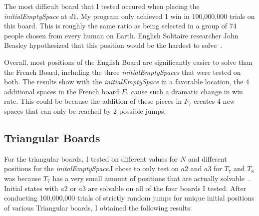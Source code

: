 \documentclass{article}
\begin{document}
The most difficult board that I tested occured when placing the \textit{initialEmptySpace} at $d1$. My program only achieved 1 win in 100,000,000 trials on this board. This is roughly the same ratio as being selected in a group of 74 people chosen from every human on Earth. English Solitaire researcher John Beasley hypothesized that this position would be the hardest to solve~\cite{Beasley}.

Overall, most positions of the English Board are significantly easier to solve than the French Board, including the three \textit{initialEmptySpaces} that were tested on both. The results show with the \textit{initialEmptySpace} in a favorable location, the 4 additional spaces in the French board $F_7$ cause such a dramatic change in win rate. This could be because the addition of these pieces in $F_7$ creates 4 new spaces that can only be reached by 2 possible jumps.

\subsection{Triangular Boards}
\label{3.3Triangular}
For the triangular boards, I tested on different values for $N$ and different positions for the \textit{initalEmptySpace}.I chose to only test on $a2$ and $a3$ for $T_7$ and $T_8$ was because $T_7$ has a very small amount of positions that are actually solvable~\cite{Bell}. Initial states with $a2$ or $a3$ are solvable on all of the four boards I tested. After conducting 100,000,000 trials of strictly random jumps for unique initial positions of various Triangular boards, I obtained the following results:
\end{document}
